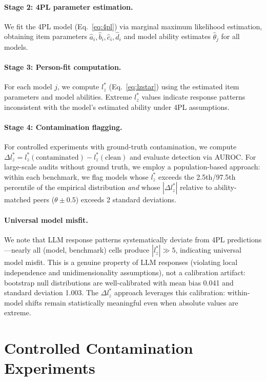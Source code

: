 \documentclass[11pt,a4paper]{article}
\begin{document}
\paragraph{Stage 2: 4PL parameter estimation.}
We fit the 4PL model (Eq.~\ref{eq:4pl}) via marginal maximum likelihood estimation, obtaining item parameters $\hat{a}_i, \hat{b}_i, \hat{c}_i, \hat{d}_i$ and model ability estimates $\hat{\theta}_j$ for all models.

\paragraph{Stage 3: Person-fit computation.}
For each model $j$, we compute $l_{z}^{*}$ (Eq.~\ref{eq:lzstar}) using the estimated item parameters and model abilities.
Extreme $l_{z}^{*}$ values indicate response patterns inconsistent with the model's estimated ability under 4PL assumptions.

\paragraph{Stage 4: Contamination flagging.}
For controlled experiments with ground-truth contamination, we compute $\Delta l_{z}^{*} = l_{z}^{*}(\text{contaminated}) - l_{z}^{*}(\text{clean})$ and evaluate detection via AUROC.
For large-scale audits without ground truth, we employ a population-based approach: within each benchmark, we flag models whose $l_{z}^{*}$ exceeds the 2.5th/97.5th percentile of the empirical distribution \emph{and} whose $|\Delta l_{z}^{*}|$ relative to ability-matched peers ($\theta \pm 0.5$) exceeds 2 standard deviations.

\paragraph{Universal model misfit.}
We note that LLM response patterns systematically deviate from 4PL predictions---nearly all (model, benchmark) cells produce $|l_{z}^{*}| \gg 5$, indicating universal model misfit.
This is a genuine property of LLM responses (violating local independence and unidimensionality assumptions), not a calibration artifact: bootstrap null distributions are well-calibrated with mean bias 0.041 and standard deviation 1.003.
The $\Delta l_{z}^{*}$ approach leverages this calibration: within-model shifts remain statistically meaningful even when absolute values are extreme.

\section{Controlled Contamination Experiments}
\label{sec:ctrl}
\end{document}
